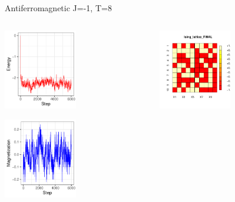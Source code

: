 \documentclass{beamer}
\begin{document}
\begin{frame}{Antiferromagnetic J=-1, T=8}
\begin{columns}
\begin{column}{0.5\textwidth}
    \begin{center}
     \includegraphics[width=0.5\textwidth]{Pic/J-1_60_2500_T=8_ENERGY.pdf}
     \end{center}
     \begin{center}
     \includegraphics[width=0.5\textwidth]{Pic/J-1_60_2500_T=8_Magnetization.pdf}
     \end{center}
\end{column}
\begin{column}{0.5\textwidth}
    \begin{center}
     \includegraphics[width=0.5\textwidth]{Pic/J-1_60_2500_T=8_FINAL.pdf}

\end{center}
\end{column}
\end{columns}
\end{frame}
\end{document}
